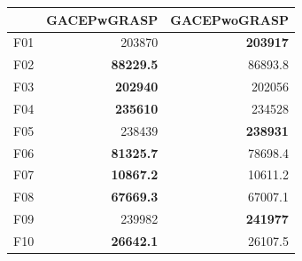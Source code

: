 \begin{table}[]
\begin{tabular}{lrr|}
\cline{2-3}
\multicolumn{1}{l|}{}                             & \multicolumn{1}{l|}{\cellcolor[HTML]{FFFFC7}GACEPwGRASP}      & \multicolumn{1}{l|}{\cellcolor[HTML]{FFFFC7}GACEPwoGRASP} \\ \hline
\multicolumn{1}{|l|}{\cellcolor[HTML]{FCE6AB}F01} & \multicolumn{1}{r|}{203870}                                   & \cellcolor[HTML]{D3FFB6}\textbf{203917}                   \\ \hline
\multicolumn{1}{|l|}{\cellcolor[HTML]{FCE6AB}F02} & \multicolumn{1}{r|}{\cellcolor[HTML]{D3FFB6}\textbf{88229.5}} & 86893.8                                                   \\ \hline
\multicolumn{1}{|l|}{\cellcolor[HTML]{FCE6AB}F03} & \multicolumn{1}{r|}{\cellcolor[HTML]{D3FFB6}\textbf{202940}}  & 202056                                                    \\ \hline
\multicolumn{1}{|l|}{\cellcolor[HTML]{FCE6AB}F04} & \multicolumn{1}{r|}{\cellcolor[HTML]{D3FFB6}\textbf{235610}}  & 234528                                                    \\ \hline
\multicolumn{1}{|l|}{\cellcolor[HTML]{FCE6AB}F05} & \multicolumn{1}{r|}{238439}                                   & \cellcolor[HTML]{D3FFB6}\textbf{238931}                   \\ \hline
\multicolumn{1}{|l|}{\cellcolor[HTML]{FCE6AB}F06} & \multicolumn{1}{r|}{\cellcolor[HTML]{D3FFB6}\textbf{81325.7}} & 78698.4                                                   \\ \hline
\multicolumn{1}{|l|}{\cellcolor[HTML]{FCE6AB}F07} & \multicolumn{1}{r|}{\cellcolor[HTML]{D3FFB6}\textbf{10867.2}} & 10611.2                                                   \\ \hline
\multicolumn{1}{|l|}{\cellcolor[HTML]{FCE6AB}F08} & \multicolumn{1}{r|}{\cellcolor[HTML]{D3FFB6}\textbf{67669.3}} & 67007.1                                                   \\ \hline
\multicolumn{1}{|l|}{\cellcolor[HTML]{FCE6AB}F09} & \multicolumn{1}{r|}{239982}                                   & \cellcolor[HTML]{D3FFB6}\textbf{241977}                   \\ \hline
\multicolumn{1}{|l|}{\cellcolor[HTML]{FCE6AB}F10} & \multicolumn{1}{r|}{\cellcolor[HTML]{D3FFB6}\textbf{26642.1}} & 26107.5                                                   \\ \hline

\end{tabular}
\end{table}
